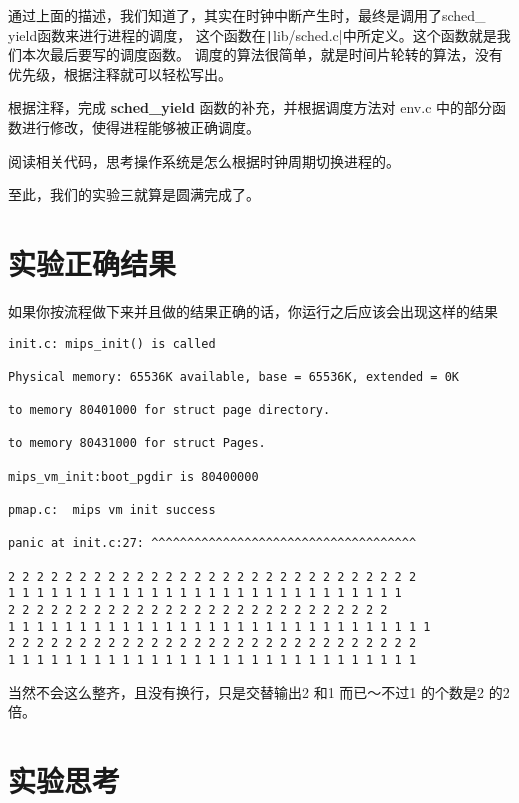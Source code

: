 通过上面的描述，我们知道了，其实在时钟中断产生时，最终是调用了sched\_ yield函数来进行进程的调度，
这个函数在\texttt|lib/sched.c|中所定义。这个函数就是我们本次最后要写的调度函数。
调度的算法很简单，就是时间片轮转的算法，没有优先级，根据注释就可以轻松写出。

\begin{exercise}
根据注释，完成 \textbf{sched\_yield }函数的补充，并根据调度方法对 env.c 中的部分函数进行修改，使得进程能够被正确调度。
\end{exercise}

\begin{thinking}\label{think-进程调度}
阅读相关代码，思考操作系统是怎么根据时钟周期切换进程的。
\end{thinking}

至此，我们的实验三就算是圆满完成了。

\section{实验正确结果}
如果你按流程做下来并且做的结果正确的话，你运行之后应该会出现这样的结果

\begin{verbatim}
init.c: mips_init() is called

Physical memory: 65536K available, base = 65536K, extended = 0K

to memory 80401000 for struct page directory.

to memory 80431000 for struct Pages.

mips_vm_init:boot_pgdir is 80400000

pmap.c:  mips vm init success

panic at init.c:27: ^^^^^^^^^^^^^^^^^^^^^^^^^^^^^^^^^^^^^

2 2 2 2 2 2 2 2 2 2 2 2 2 2 2 2 2 2 2 2 2 2 2 2 2 2 2 2 2 
1 1 1 1 1 1 1 1 1 1 1 1 1 1 1 1 1 1 1 1 1 1 1 1 1 1 1 1   
2 2 2 2 2 2 2 2 2 2 2 2 2 2 2 2 2 2 2 2 2 2 2 2 2 2 2 
1 1 1 1 1 1 1 1 1 1 1 1 1 1 1 1 1 1 1 1 1 1 1 1 1 1 1 1 1 1 
2 2 2 2 2 2 2 2 2 2 2 2 2 2 2 2 2 2 2 2 2 2 2 2 2 2 2 2 2 
1 1 1 1 1 1 1 1 1 1 1 1 1 1 1 1 1 1 1 1 1 1 1 1 1 1 1 1 1 
\end{verbatim}

当然不会这么整齐，且没有换行，只是交替输出2 和1 而已～不过1 的个数是2 的2 倍。

\section{实验思考}

